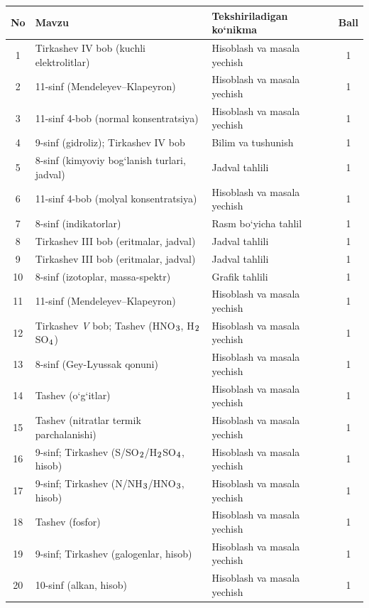 \documentclass[11pt,a4paper]{article}
\renewcommand{\textsubscript}[1]{\ensuremath{_{\text{\fontsize{8}{8}\selectfont #1}}}}
\begin{document}
{\small\noindent\begin{longtable}{|c|p{7.2cm}|p{5.4cm}|c|}\hline \textbf{No} & \textbf{Mavzu} & \textbf{Tekshiriladigan ko`nikma} & \textbf{Ball}\\\hline
1 & Tirkashev IV bob (kuchli elektrolitlar) & Hisoblash va masala yechish & 1\\\hline
2 & 11-sinf (Mendeleyev--Klapeyron) & Hisoblash va masala yechish & 1\\\hline
3 & 11-sinf 4-bob (normal konsentratsiya) & Hisoblash va masala yechish & 1\\\hline
4 & 9-sinf (gidroliz); Tirkashev IV bob & Bilim va tushunish & 1\\\hline
5 & 8-sinf (kimyoviy bog`lanish turlari, jadval) & Jadval tahlili & 1\\\hline
6 & 11-sinf 4-bob (molyal konsentratsiya) & Hisoblash va masala yechish & 1\\\hline
7 & 8-sinf (indikatorlar) & Rasm bo`yicha tahlil & 1\\\hline
8 & Tirkashev III bob (eritmalar, jadval) & Jadval tahlili & 1\\\hline
9 & Tirkashev III bob (eritmalar, jadval) & Jadval tahlili & 1\\\hline
10 & 8-sinf (izotoplar, massa-spektr) & Grafik tahlili & 1\\\hline
11 & 11-sinf (Mendeleyev--Klapeyron) & Hisoblash va masala yechish & 1\\\hline
12 & Tirkashev \textit{V} bob; Tashev (HNO\textsubscript{3}, H\textsubscript{2}SO\textsubscript{4}) & Hisoblash va masala yechish & 1\\\hline
13 & 8-sinf (Gey-Lyussak qonuni) & Hisoblash va masala yechish & 1\\\hline
14 & Tashev (o`g`itlar) & Hisoblash va masala yechish & 1\\\hline
15 & Tashev (nitratlar termik parchalanishi) & Hisoblash va masala yechish & 1\\\hline
16 & 9-sinf; Tirkashev (S/SO\textsubscript{2}/H\textsubscript{2}SO\textsubscript{4}, hisob) & Hisoblash va masala yechish & 1\\\hline
17 & 9-sinf; Tirkashev (N/NH\textsubscript{3}/HNO\textsubscript{3}, hisob) & Hisoblash va masala yechish & 1\\\hline
18 & Tashev (fosfor) & Hisoblash va masala yechish & 1\\\hline
19 & 9-sinf; Tirkashev (galogenlar, hisob) & Hisoblash va masala yechish & 1\\\hline
20 & 10-sinf (alkan, hisob) & Hisoblash va masala yechish & 1\\\hline

\end{longtable}}
\end{document}
